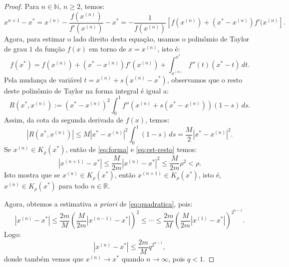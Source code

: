\begin{proof}
  Para $n\in\mathbb{N}$, $n\geq 2$, temos:
  \begin{equation}\label{eq:forma}
    x^{n+1}-x^* = x^{(n)} - \frac{f(x^{(n)})}{f'(x^{(n)})} - x^* = -\frac{1}{f(x^{(n)})}\left[f(x^{(n)})+(x^*-x^{(n)})f'(x^{(n)}\right].
  \end{equation}
Agora, para estimar o lado direito desta equação, usamos o polinômio de Taylor de grau $1$ da função $f(x)$ em torno de $x = x^{(n)}$, isto é:
\begin{equation*}
  f(x^*) = f(x^{(n)}) + (x^* - x^{(n)})f'(x^{(n)}) + \int_{x^{(n)}}^{x^*} f''(t)(x^* - t)\,dt.
\end{equation*}
Pela mudança de variável $t = x^{(n)} + s(x^{(n)} - x^*)$, observamos que o resto deste polinômio de Taylor na forma integral é igual a:
\begin{equation*}
  R(x^*,x^{(n)}) := (x^* - x^{(n)})^2\int_0^1 f''\left(x^{(n)} + s(x^* - x^{(n)})\right)(1-s)\,ds.
\end{equation*}
Assim, da cota da segunda derivada de $f(x)$, temos:
\begin{equation}\label{eq:est-resto}
  |R(x^*,x^{(n)})| \leq M|x^*-x^{(n)}|^2\int_0^1 (1-s)\,ds = \frac{M}{2}|x^* - x^{(n)}|^2.
\end{equation}\label{eq:quadratica}
Se $x^{(n)}\in K_\rho(x^*)$, então de \eqref{eq:forma} e \eqref{eq:est-resto} temos:
\begin{equation}
  |x^{(n+1)} - x^*| \leq \frac{M}{2m}|x^{(n)} - x^*|^2 \leq \frac{M}{2m}\rho^2 < \rho.
\end{equation}
Isto mostra que se $x^{(n)}\in K_\rho(x^*)$, então $x^{(n+1)}\in K_\rho(x^*)$, isto é, $x^{(n)}\in K_\rho(x^*)$ para todo $n\in\mathbb{R}$.

Agora, obtemos a estimativa \emph{a priori} de \eqref{eq:quadratica}, pois:
\begin{equation*}
  |x^{(n)} - x^*| \leq \frac{2m}{M}\left(\frac{M}{2m}|x^{(n-1)}-x^*|\right)^2 \leq \cdots \leq \frac{2m}{M}\left(\frac{M}{2m} |x^{(1)}-x^*|\right)^{2^{n-1}}.
\end{equation*}
Logo:
\begin{equation*}
  |x^{(n)} - x^*| \leq \frac{2m}{M}q^{2^{n-1}},
\end{equation*}
donde também vemos que $x^{(n)}\to x^*$ quando $n\to\infty$, pois $q < 1$.


\end{proof}
